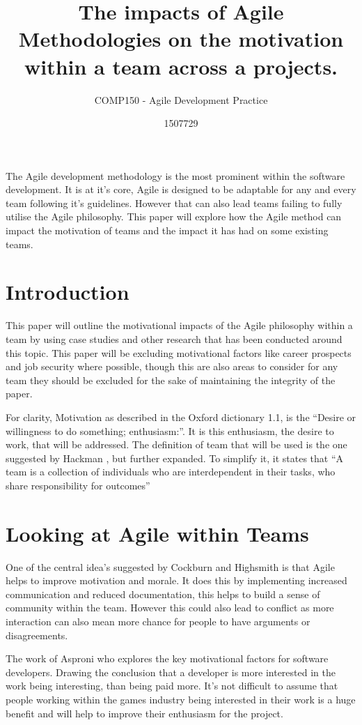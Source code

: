 \documentclass{scrartcl}
\title{The impacts of Agile Methodologies on the motivation within a team across a projects.}
\subtitle{COMP150 - Agile Development Practice}
\author{1507729}
\begin{document}
\maketitle

\abstract The Agile development methodology is the most prominent within the software development. It is at it's core, Agile is designed to be adaptable for any and every team following it's guidelines. However that can also lead teams failing to fully utilise the Agile philosophy. This paper will explore how the Agile method can impact the motivation of teams and the impact it has had on some existing teams.

\section{Introduction}

This paper will outline the motivational impacts of the Agile philosophy \cite{Agile} within a team by using case studies and other research that has been conducted around this topic. This paper will be excluding motivational factors like career prospects and job security where possible, though this are also areas to consider for any team they should be excluded for the sake of maintaining the integrity of the paper. 

For clarity, Motivation as described in the Oxford dictionary 1.1, is the ``Desire or willingness to do something; enthusiasm:''. It is this enthusiasm, the desire to work, that will be addressed. The definition of team that will be used is the one suggested by Hackman \cite{GroupExec}, but further expanded. To simplify it, it  states that ``A team is a collection of individuals who are interdependent in their tasks, who share responsibility for outcomes'' 


\section{Looking at Agile within Teams}
One of the central idea's suggested by Cockburn and Highsmith \cite{AgilePeople} is that Agile helps to improve motivation and morale. It does this by implementing increased communication and reduced documentation, this helps to build a sense of community within the team. However this could also lead to conflict as more interaction can also mean more chance for people to have arguments or disagreements. 

The work of Asproni \cite{MotivationSoftware} who explores the key motivational factors for software developers. Drawing the conclusion that a developer is more interested in the work being interesting, than being paid more. It's not difficult to assume that people working within the games industry being interested in their work is a huge benefit and will help to improve their enthusiasm for the project. 
\end{document}
